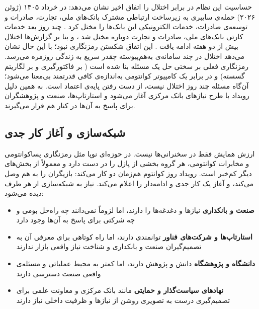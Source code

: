\documentclass[a4paper,12pt]{article}
\begin{document}
	حساسیت این نظام در برابر اختلال را اتفاق اخیر نشان می‌دهد:
	در خرداد ۱۴۰۵ (ژوئن ۲۰۲۶) حمله‌ی سایبری به زیرساخت ارتباطی مشترک بانک‌های ملی، تجارت، صادرات و توسعه‌ی صادرات،
	خدمات الکترونیکی این بانک‌ها را مختل کرد \citep{aa-banks}.
	چند روز بعد خدمات کارتی بانک‌های ملی، صادرات و تجارت دوباره مختل شد \citep{ary-banks}،
	و بنا بر گزارش‌ها اختلال بیش از دو هفته ادامه یافت \citep{iranintl-banks}.
	این اتفاق شکستن رمزنگاری نبود؛ با این حال نشان می‌دهد اختلال در چند سامانه‌ی به‌هم‌پیوسته چقدر سریع به زندگی روزمره می‌رسد.
	رمزنگاری فعلی بر سختی حل یک مسئله بنا شده است
	( بر فاکتورگیری و  بر لگاریتم گسسته) و در برابر یک کامپیوتر کوانتومی به‌اندازه‌ی کافی قدرتمند بی‌معنا می‌شود؛
	آن‌گاه مسئله چند روز اختلال نیست، از دست رفتن پایه‌ی اعتماد است.
	به همین دلیل رویداد با طرح نیازهای بانک مرکزی آغاز می‌شود و استارتاپ‌ها، صنعت و پژوهشگران برای پاسخ به آن‌ها در کنار هم قرار می‌گیرند.

	\subsection*{شبکه‌سازی و آغاز کار جدی}
	ارزش همایش فقط در سخنرانی‌ها نیست. در حوزه‌ای نوپا مثل رمزنگاری پساکوانتومی و مخابرات کوانتومی، هر گروه بخشی از پازل را در دست دارد و معمولاً از بخش‌های دیگر کم‌خبر است.
	رویداد روز کوانتوم هم‌زمان دو کار می‌کند: بازیگران را به هم وصل می‌کند، و آغاز یک کار جدی و ادامه‌دار را اعلام می‌کند.
	نیاز به شبکه‌سازی از هر طرف دیده می‌شود:
	\begin{itemize}[rightmargin=0.5cm, itemsep=4pt]
		\item \textbf{صنعت و بانکداری} نیازها و دغدغه‌ها را دارند، اما لزوماً نمی‌دانند چه راه‌حل بومی و چه شرکتی برای پاسخ به آن‌ها وجود دارد
		\item \textbf{استارتاپ‌ها و شرکت‌های فناور} توانمندی دارند، اما راه کوتاهی برای معرفی آن به تصمیم‌گیران صنعت و بانکداری و شناخت نیاز واقعی بازار ندارند
		\item \textbf{دانشگاه و پژوهشگاه} دانش و پژوهش دارند، اما کمتر به محیط عملیاتی و مسئله‌ی واقعی صنعت دسترسی دارند
		\item \textbf{نهادهای سیاست‌گذار و حمایتی} مانند بانک مرکزی و معاونت علمی برای تصمیم‌گیری درست به تصویری روشن از نیازها و ظرفیت داخلی نیاز دارند
	\end{itemize}
\end{document}
